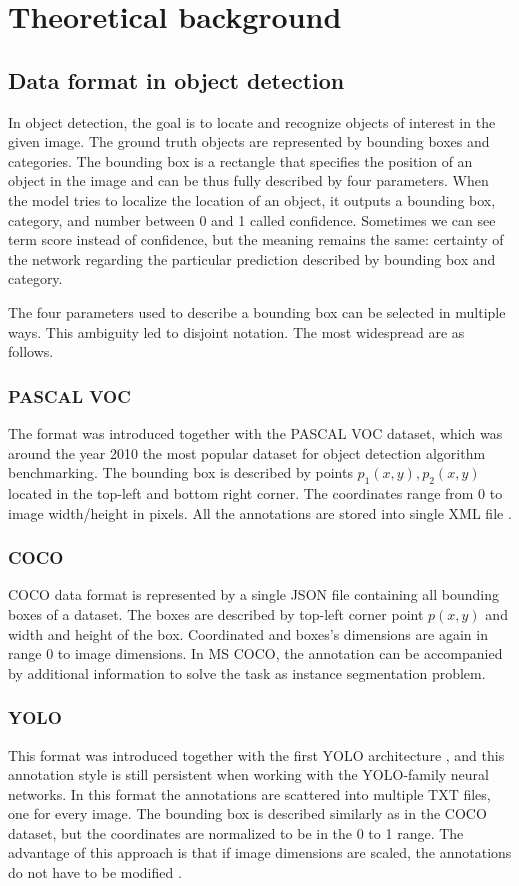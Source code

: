 \chapter{Theoretical background}
\section{Data format in object detection}
In object detection, the goal is to locate and recognize objects of interest in the given image. The ground truth objects are represented by bounding boxes and categories. The bounding box is a rectangle that specifies the position of an object in the image and can be thus fully described by four parameters. When the model tries to localize the location of an object, it outputs a bounding box, category, and number between 0 and 1 called confidence. Sometimes we can see term score instead of confidence, but the meaning remains the same: certainty of the network regarding the particular prediction described by bounding box and category.

The four parameters used to describe a bounding box can be selected in multiple ways. This ambiguity led to disjoint notation. The most widespread are as follows.
\subsection{PASCAL VOC}
The format was introduced together with the PASCAL VOC dataset, which was around the year 2010 the most popular dataset for object detection algorithm benchmarking. The bounding box is described by points $p_1(x,y),p_2(x,y)$ located in the top-left and bottom right corner. The coordinates range from 0 to image width/height in pixels. All the annotations are stored into single XML file \cite{Everingham2009,Padilla2021}.
\subsection{COCO}
COCO data format is represented by a single JSON file containing all bounding boxes of a dataset. The boxes are described by top-left corner point $p(x,y)$ and width and height of the box. Coordinated and boxes's dimensions are again in range 0 to image dimensions. In MS COCO, the annotation can be accompanied by additional information to solve the task as instance segmentation problem.
\subsection{YOLO}
This format was introduced together with the first YOLO architecture \cite{Redmon2015}, and this annotation style is still persistent when working with the YOLO-family neural networks.
In this format the annotations are scattered into multiple TXT files, one for every image.
The bounding box is described similarly as in the COCO dataset, but the coordinates are normalized to be in the 0 to 1 range. The advantage of this approach is that if image dimensions are scaled, the annotations do not have to be modified \cite{Redmon2015,Padilla2021}.


